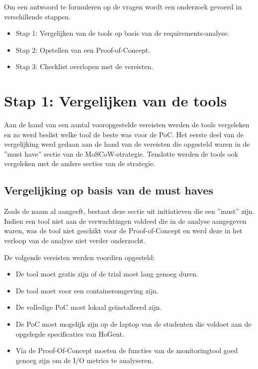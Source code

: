 Om een antwoord te formuleren op de vragen wordt een onderzoek gevoerd in verschillende stappen.

\begin{itemize}
    \item Stap 1: Vergelijken van de tools op basis van de requirements-analyse.
    \item Stap 2: Opstellen van een Proof-of-Concept.
    \item Stap 3: Checklist overlopen met de vereisten.
\end{itemize}

\section{Stap 1: Vergelijken van de tools}
 
Aan de hand van een aantal vooropgestelde vereisten werden de tools vergeleken en zo werd beslist welke tool de beste was voor de PoC. Het eerste deel van de vergelijking werd gedaan aan de hand van de vereisten die opgesteld waren in de ''must have'' sectie van de MoSCoW-strategie. Tenslotte werden de tools ook vergeleken met de andere secties van de strategie.

\subsection{Vergelijking op basis van de must haves}

Zoals de naam al aangeeft, bestaat deze sectie uit initiatieven die een ''must'' zijn. Indien een tool niet aan de verwachtingen voldeed die in de analyse aangegeven waren, was de tool niet geschikt voor de Proof-of-Concept en werd deze in het verloop van de analyse niet verder onderzocht.

De volgende vereisten werden voordien opgesteld:

\begin{itemize}
    \item De tool moet gratis zijn of de trial moet lang genoeg duren.
    \item De tool moet voor een containeromgeving zijn.
    \item De volledige PoC moet lokaal geïnstalleerd zijn.
    \item De PoC moet mogelijk zijn op de laptop van de studenten die voldoet aan de opgelegde specificaties van HoGent.
    \item Via de Proof-Of-Concept moeten de functies van de monitoringtool goed genoeg zijn om de I/O metrics te analyseren.
\end{itemize}

